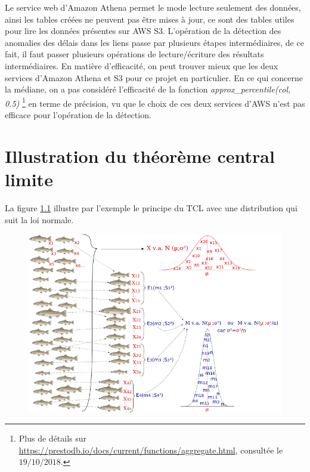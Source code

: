 Le service web d'Amazon Athena permet le mode lecture seulement des données, ainsi les tables créées ne peuvent pas être mises à jour, ce sont des tables utiles pour lire les données présentes sur AWS S3.  L'opération de la détection des anomalies des délais dans les liens passe par plusieurs étapes intermédiaires, de ce fait, il faut passer plusieurs opérations de lecture/écriture des résultats intermédiaires. En matière d'efficacité, on peut trouver mieux que les deux services d'Amazon  Athena et S3 pour ce projet en particulier.  En ce qui concerne la médiane, on a pas considéré l'efficacité de la fonction \textit{approx\_percentile(col, 0.5)} \footnote{Plus de détails sur \url{https://prestodb.io/docs/current/functions/aggregate.html}, consultée le $19/10/2018$.} en terme de précision, vu que le choix de ces deux services d'AWS n'est pas efficace pour l'opération de la détection.
 









\appendix

\chapter{Illustration du théorème central limite} \label{appendix:clt-exemple}
La figure \ref{fig:tcl} illustre par l'exemple le principe du TCL avec une distribution qui suit la loi normale. 
\begin{figure}[H]
	\centering
	\includegraphics[width=1\linewidth]{illustrations/tcl}
	\caption{}
	\label{fig:tcl}
	
\end{figure}















